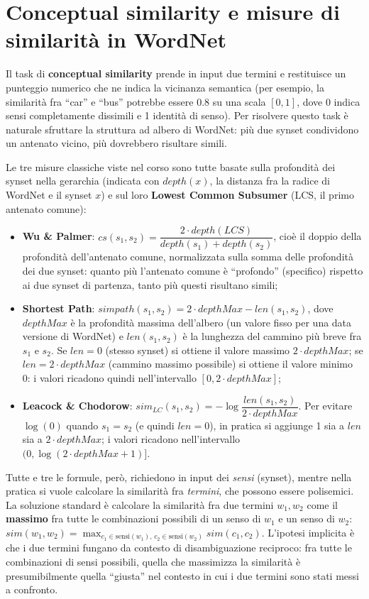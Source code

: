 \documentclass[11pt,a4paper]{report}
\begin{document}
\section{Conceptual similarity e misure di similarità in WordNet}

Il task di \textbf{conceptual similarity} prende in input due termini e restituisce un punteggio numerico che ne indica la vicinanza semantica (per esempio, la similarità fra ``car'' e ``bus'' potrebbe essere 0.8 su una scala $[0,1]$, dove 0 indica sensi completamente dissimili e 1 identità di senso). Per risolvere questo task è naturale sfruttare la struttura ad albero di WordNet: più due synset condividono un antenato vicino, più dovrebbero risultare simili.

Le tre misure classiche viste nel corso sono tutte basate sulla profondità dei synset nella gerarchia (indicata con $depth(x)$, la distanza fra la radice di WordNet e il synset $x$) e sul loro \textbf{Lowest Common Subsumer} (LCS, il primo antenato comune):
\begin{itemize}
  \item \textbf{Wu \& Palmer}: $cs(s_1,s_2) = \dfrac{2 \cdot depth(LCS)}{depth(s_1) + depth(s_2)}$, cioè il doppio della profondità dell'antenato comune, normalizzata sulla somma delle profondità dei due synset: quanto più l'antenato comune è ``profondo'' (specifico) rispetto ai due synset di partenza, tanto più questi risultano simili;
  \item \textbf{Shortest Path}: $simpath(s_1,s_2) = 2 \cdot depthMax - len(s_1,s_2)$, dove $depthMax$ è la profondità massima dell'albero (un valore fisso per una data versione di WordNet) e $len(s_1,s_2)$ è la lunghezza del cammino più breve fra $s_1$ e $s_2$. Se $len=0$ (stesso synset) si ottiene il valore massimo $2\cdot depthMax$; se $len=2\cdot depthMax$ (cammino massimo possibile) si ottiene il valore minimo 0: i valori ricadono quindi nell'intervallo $[0, 2\cdot depthMax]$;
  \item \textbf{Leacock \& Chodorow}: $sim_{LC}(s_1,s_2) = -\log \dfrac{len(s_1,s_2)}{2\cdot depthMax}$. Per evitare $\log(0)$ quando $s_1=s_2$ (e quindi $len=0$), in pratica si aggiunge 1 sia a $len$ sia a $2\cdot depthMax$; i valori ricadono nell'intervallo $(0, \log(2\cdot depthMax + 1)]$.
\end{itemize}

Tutte e tre le formule, però, richiedono in input dei \emph{sensi} (synset), mentre nella pratica si vuole calcolare la similarità fra \emph{termini}, che possono essere polisemici. La soluzione standard è calcolare la similarità fra due termini $w_1, w_2$ come il \textbf{massimo} fra tutte le combinazioni possibili di un senso di $w_1$ e un senso di $w_2$: $sim(w_1,w_2) = \max_{c_1 \in \text{sensi}(w_1),\, c_2 \in \text{sensi}(w_2)} sim(c_1,c_2)$. L'ipotesi implicita è che i due termini fungano da contesto di disambiguazione reciproco: fra tutte le combinazioni di sensi possibili, quella che massimizza la similarità è presumibilmente quella ``giusta'' nel contesto in cui i due termini sono stati messi a confronto.
\end{document}
